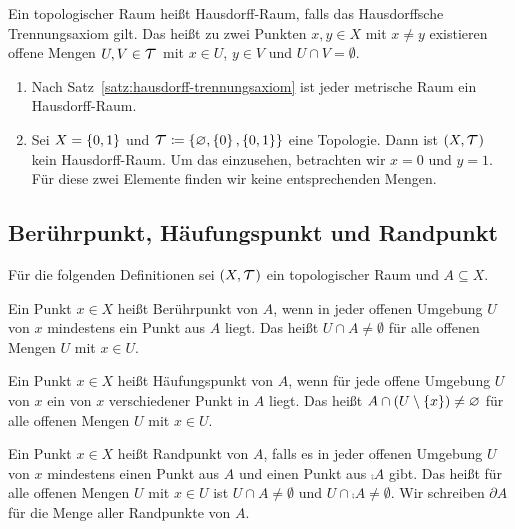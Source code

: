 \begin{definition}
    Ein topologischer Raum heißt Hausdorff-Raum, falls das Hausdorffsche Trennungsaxiom gilt. Das heißt zu zwei Punkten $x,y\in X$ mit $x\neq y$ existieren offene Mengen $U,V\in\Tau$ mit $x\in U$, $y\in V$ und $U\cap V = \emptyset$.
\end{definition}

\begin{beispiel}
    \theoremescape
    \begin{enumerate}
        \item Nach Satz~\ref{satz:hausdorff-trennungsaxiom} ist jeder metrische Raum ein Hausdorff-Raum.
        \item Sei $X=\left\{0, 1\right\}$ und $\Tau\coloneqq \set{\emptyset, \set{0}, \set{0, 1}}$ eine Topologie. Dann ist $\pair{X, \Tau}$ kein Hausdorff-Raum. Um das einzusehen, betrachten wir $x=0$ und $y=1$. Für diese zwei Elemente finden wir keine entsprechenden Mengen.
    \end{enumerate}
\end{beispiel}

\subsection{Berührpunkt, Häufungspunkt und Randpunkt}

\begin{mdframed}
    \begin{center}
        Für die folgenden Definitionen sei $\pair{X, \Tau}$ ein topologischer Raum und $A\subseteq X$.
    \end{center}
\end{mdframed}

\begin{definition}[Berührpunkt]
    Ein Punkt $x\in X$ heißt Berührpunkt von $A$, wenn in jeder offenen Umgebung $U$ von $x$ mindestens ein Punkt aus $A$ liegt. Das heißt $U\cap A \neq \emptyset$ für alle offenen Mengen $U$ mit $x\in U$.
\end{definition}

\begin{definition}[Häufungspunkt]
    Ein Punkt $x\in X$ heißt Häufungspunkt von $A$, wenn für jede offene Umgebung $U$ von $x$ ein von $x$ verschiedener Punkt in $A$ liegt. Das heißt $A\cap \left(U\setminus\left\{x\right\}\right) \neq \varnothing$ für alle offenen Mengen $U$ mit $x\in U$.
\end{definition}

\begin{definition}[Randpunkt]
    Ein Punkt $x\in X$ heißt Randpunkt von $A$, falls es in jeder offenen Umgebung $U$ von $x$ mindestens einen Punkt aus $A$ und einen Punkt aus $\comp{A}$ gibt. Das heißt für alle offenen Mengen $U$ mit $x\in U$ ist $U\cap A \neq \emptyset$ und $U\cap \comp{A} \neq \emptyset$. Wir schreiben $\partial A$ für die Menge aller Randpunkte von $A$.
\end{definition}

